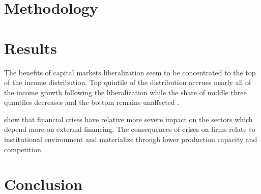 \documentclass[a4paper,11pt]{article}
\begin{document}
%
%
\section{Methodology}

\section{Results}
The benefits of capital markets liberalization seem to be concentrated to the top of the income distribution. Top quintile of the distribution accrues nearly all of the income growth following the liberalization while the share of middle three quantiles decreases and the bottom remains unaffected \citep{das2003income}.

\citet{kroszneretal2007} show that financial crises have relative more severe impact on the sectors which depend more on external financing. The consequences of crises on firms relate to institutional environment and materialize through lower production capacity and competition.

\section{Conclusion}
\label{sec:conclusion}

\clearpage
%


%
%

\renewcommand{\thesection}{A\arabic{section}}%
\renewcommand{\thetable}{A\arabic{table}}%
\renewcommand{\thefigure}{A\arabic{figure}}%
\renewcommand{\theequation}{A\arabic{eq}} 
\end{document}
